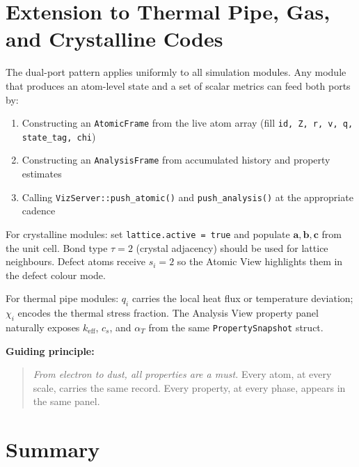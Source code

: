 ﻿\documentclass[11pt]{article}
\begin{document}
\section{Extension to Thermal Pipe, Gas, and Crystalline Codes}
\label{sec:extension}

The dual-port pattern applies uniformly to all simulation modules.
Any module that produces an atom-level state and a set of scalar metrics
can feed both ports by:

\begin{enumerate}[noitemsep]
  \item Constructing an \texttt{AtomicFrame} from the live atom array
        (fill \texttt{id, Z, r, v, q, state\_tag, chi})
  \item Constructing an \texttt{AnalysisFrame} from accumulated history
        and property estimates
  \item Calling \texttt{VizServer::push\_atomic()} and
        \texttt{push\_analysis()} at the appropriate cadence
\end{enumerate}

For crystalline modules: set \texttt{lattice.active = true} and populate
$\mathbf{a}, \mathbf{b}, \mathbf{c}$ from the unit cell. Bond type
$\tau = 2$ (crystal adjacency) should be used for lattice neighbours.
Defect atoms receive $s_i = 2$ so the Atomic View highlights them in the
defect colour mode.

For thermal pipe modules: $q_i$ carries the local heat flux or temperature
deviation; $\chi_i$ encodes the thermal stress fraction.
The Analysis View property panel naturally exposes $k_\mathrm{eff}$,
$c_s$, and $\alpha_T$ from the same \texttt{PropertySnapshot} struct.

\bigskip\noindent
\textbf{Guiding principle:}
\begin{quote}
  \textit{From electron to dust, all properties are a must.}
  Every atom, at every scale, carries the same record.
  Every property, at every phase, appears in the same panel.
\end{quote}

\section{Summary}
\end{document}
